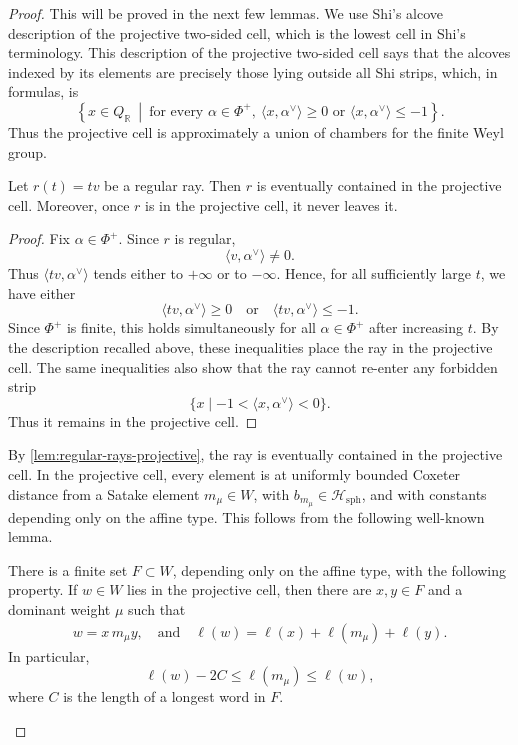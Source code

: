 \documentclass[a4paper,11pt]{amsart}
\newcommand{\R}{\mathbb{R}}
\newcommand{\Hecke}{\mc H}
\newcommand{\mc}{\mathcal}
\numberwithin{equation}{subsection}
\theoremstyle{definition}
\theoremstyle{remark}
\begin{document}
\begin{proof}
This will be proved in the next few lemmas. We use Shi's alcove description
\cite{Shi-two-sided-cell-I,Shi-two-sided-cell-II} of the projective two-sided
cell, which is the lowest cell in Shi's terminology. This description of the projective two-sided cell says that the alcoves indexed by its elements are precisely those lying outside all Shi strips, which, in formulas, is
\[
\left\{
x\in Q_{\R}\ \middle|\ 
\text{for every }\alpha\in \Phi^+,\ 
\langle x,\alpha^\vee\rangle\geq 0
\text{ or }
\langle x,\alpha^\vee\rangle\leq -1
\right\}.
\]
Thus the projective cell is approximately a union of chambers for the finite Weyl group.

\begin{Lemma}\label{lem:regular-rays-projective}
Let \(r(t)=tv\) be a regular ray. Then \(r\) is eventually contained in the
projective cell. Moreover, once \(r\) is in the projective
cell, it never leaves it.
\end{Lemma}

\begin{proof}
Fix \(\alpha\in \Phi^+\). Since \(r\) is regular,
\[
\langle v,\alpha^\vee\rangle\neq 0.
\]
Thus \(\langle tv,\alpha^\vee\rangle\) tends either to \(+\infty\) or to
\(-\infty\). Hence, for all sufficiently large \(t\), we have either
\[
\langle tv,\alpha^\vee\rangle\geq 0
\quad
\text{or}
\quad
\langle tv,\alpha^\vee\rangle\leq -1.
\]
Since \(\Phi^+\) is finite, this holds simultaneously for all
\(\alpha\in\Phi^+\) after increasing \(t\). By the description recalled above, these inequalities place the ray in the projective cell. The same
inequalities also show that the ray cannot re-enter any
forbidden strip
\[
\{x\mid -1<\langle x,\alpha^\vee\rangle<0\}.
\]
Thus it remains in the projective cell.
\end{proof}

By \autoref{lem:regular-rays-projective}, the ray is eventually contained in
the projective cell. In the projective cell, every element is at uniformly
bounded Coxeter distance from a Satake element \(m_\mu\in W\), with
\(b_{m_\mu}\in\Hecke_{\mathrm{sph}}\), and with constants depending only on
the affine type. This follows from the following well-known lemma.

\begin{Lemma}\label{lem:projective-close-to-satake}
There is a finite set \(F\subset W\), depending only on the affine type, with
the following property. If \(w \in W\) lies in the projective cell, then there
are \(x,y\in F\) and a dominant weight \(\mu\) such that
\begin{align*}
w=x\,m_\mu y,
\quad \text{and} \quad
\ell(w)=\ell(x)+\ell(m_\mu)+\ell(y).
\end{align*}
In particular,
\[
\ell(w)-2C\leq \ell(m_\mu)\leq \ell(w),
\]
where \(C\) is the length of a longest word in \(F\).
\end{Lemma}


\end{proof}
\end{document}
